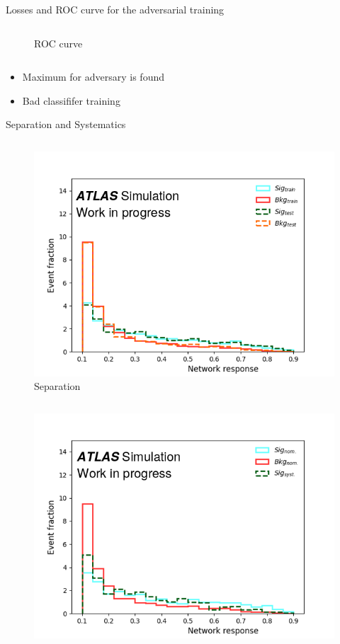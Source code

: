 \documentclass[12pt]{beamer}
\begin{document}
\begin{frame}{Losses and ROC curve for the adversarial training}
\begin{column}{0.5\textwidth}
\begin{figure}
        \caption{ROC curve}
        \label{fig:my_label}
    \end{figure}
\end{column}
\begin{itemize}
    \item Maximum for adversary is found
    \item Bad classififer training
\end{itemize}
\end{frame}

\begin{frame}{Separation and Systematics}
\vspace{-1cm}
    \begin{column}{0.5\textwidth}
    \begin{figure}
        \centering
        \includegraphics[width=1.1\textwidth]{adver_response.png}
        \caption{Separation}
        \label{fig:my_label}
    \end{figure}
\end{column}
\begin{column}{0.5\textwidth}
    \begin{figure}
        \centering
        \includegraphics[width=1.1\textwidth]{adver_syst.png}

\end{figure}
\end{column}
\end{frame}
\end{document}
